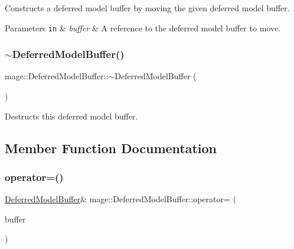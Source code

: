 Constructs a deferred model buffer by moving the given deferred model buffer.


\begin{DoxyParams}[1]{Parameters}
\mbox{\tt in}  & {\em buffer} & A reference to the deferred model buffer to move. \\
\hline
\end{DoxyParams}
\hypertarget{structmage_1_1_deferred_model_buffer_a94a9fe29f0abeaa0583b98de71902897}{}\label{structmage_1_1_deferred_model_buffer_a94a9fe29f0abeaa0583b98de71902897} 
\subsubsection{\texorpdfstring{$\sim$\+Deferred\+Model\+Buffer()}{~DeferredModelBuffer()}}
{\footnotesize\ttfamily mage\+::\+Deferred\+Model\+Buffer\+::$\sim$\+Deferred\+Model\+Buffer (\begin{DoxyParamCaption}{ }\end{DoxyParamCaption})\hspace{0.3cm}{\ttfamily [default]}}

Destructs this deferred model buffer. 

\subsection{Member Function Documentation}
\hypertarget{structmage_1_1_deferred_model_buffer_aaaa9056b22ab42b65273406c6b85e0a2}{}\label{structmage_1_1_deferred_model_buffer_aaaa9056b22ab42b65273406c6b85e0a2} 
\subsubsection{\texorpdfstring{operator=()}{operator=()}\hspace{0.1cm}{\footnotesize\ttfamily [1/2]}}
{\footnotesize\ttfamily \hyperlink{structmage_1_1_deferred_model_buffer}{Deferred\+Model\+Buffer}\& mage\+::\+Deferred\+Model\+Buffer\+::operator= (\begin{DoxyParamCaption}\item[{const \hyperlink{structmage_1_1_deferred_model_buffer}{Deferred\+Model\+Buffer} \&}]{buffer }\end{DoxyParamCaption})\hspace{0.3cm}{\ttfamily [default]}}

